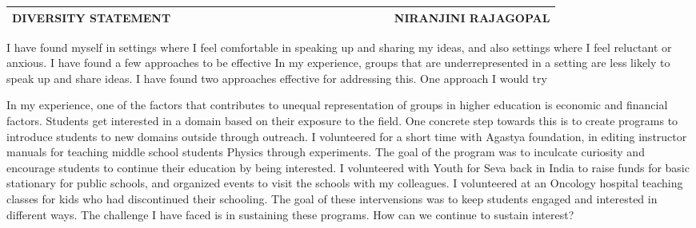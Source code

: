 \documentclass[10pt]{article}
\date{}
\begin{document}


\begin{table}
\color{blue}
\begin{tabular*}{\textwidth}{l r}
\large\textbf{DIVERSITY STATEMENT} & 
\hfill \ \ \ \ \ \ \ \ \ \ \ \ \ \ \ \ \ \ \ \
\ \ \ \ \ \ \ \ \ \ \ \ \ 
\large\textbf{NIRANJINI RAJAGOPAL}\\
\hline
\end{tabular*}

\end{table}




I have found myself in settings where I feel comfortable in speaking up and sharing my ideas, and also settings where I feel reluctant or anxious. I have found a few approaches to be effective
In my experience, groups that are underrepresented in a setting are less likely to speak up and share ideas. I have found two approaches effective for addressing this.
One approach I would try

In my experience, one of the factors that contributes to unequal representation of groups in higher education is economic and financial factors. Students get interested in a domain based on their exposure to the field. One concrete step towards this is to create programs to introduce students to new domains outside through outreach. I volunteered for a short time with Agastya foundation, in editing instructor manuals for teaching middle school students Physics through experiments. The goal of the program was to inculcate curiosity and encourage students to continue their education by being interested. I volunteered with Youth for Seva back in India to raise funds for basic stationary for public schools, and organized events to visit the schools with my colleagues. I volunteered at an Oncology hospital teaching classes for kids who had discontinued their schooling. The goal of these intervensions was to keep students engaged and interested in different ways. The challenge I have faced is in sustaining these programs. How can we continue to sustain interest? \\
\end{document}
